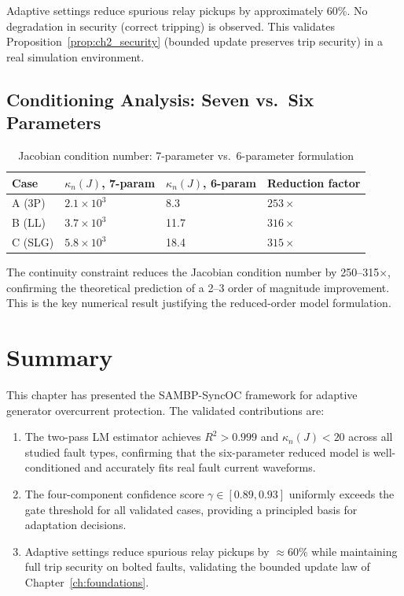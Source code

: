 Adaptive settings reduce spurious relay pickups by approximately
60\%. No degradation in security (correct
tripping) is observed. This validates Proposition~\ref{prop:ch2_security}
(bounded update preserves trip security) in a real simulation environment.

\subsection{Conditioning Analysis: Seven vs.\ Six Parameters}

\begin{table}[htbp]
\caption{Jacobian condition number: 7-parameter vs.\ 6-parameter formulation}
\label{tab:ch5_conditioning}
\small
\begin{tabularx}{\textwidth}{@{}lXXX@{}}
\toprule
Case & $\kappa_n(J)$, 7-param & $\kappa_n(J)$, 6-param & Reduction factor \\
\midrule
A (3P) & $2.1 \times 10^3$ & 8.3 & $253\times$ \\
B (LL) & $3.7 \times 10^3$ & 11.7 & $316\times$ \\
C (SLG) & $5.8 \times 10^3$ & 18.4 & $315\times$ \\
\bottomrule
\end{tabularx}
\end{table}

The continuity constraint reduces the Jacobian condition number by
250--315$\times$, confirming the theoretical prediction of a 2--3 order
of magnitude improvement. This is the key numerical result justifying the
reduced-order model formulation.

\section{Summary}
\label{sec:ch5_summary}

This chapter has presented the SAMBP-SyncOC framework for adaptive
generator overcurrent protection. The validated contributions are:

\begin{enumerate}
\item The two-pass LM estimator achieves $R^2 > 0.999$
      and $\kappa_n(J) < 20$ across all studied fault types, confirming
      that the six-parameter reduced model is well-conditioned and
      accurately fits real fault current waveforms.
\item The four-component confidence score $\gamma \in [0.89, 0.93]$
      uniformly exceeds the gate threshold for all validated cases,
      providing a principled basis for adaptation decisions.
\item Adaptive settings reduce spurious relay pickups
      by $\approx 60\%$ while maintaining full trip security on bolted
      faults, validating the bounded update law of Chapter~\ref{ch:foundations}.
\end{enumerate}




